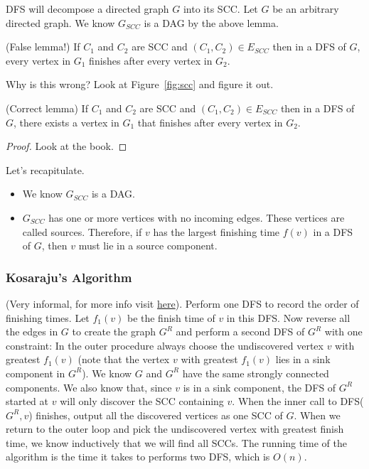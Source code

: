 DFS will decompose a directed graph $G$ into its SCC. Let $G$ be an
arbitrary directed graph. We know $G_{SCC}$ is a DAG by the above
lemma.

\begin{lemma}
    (False lemma!) If $C_1$ and $C_2$ are SCC and $(C_1, C_2) \in E_
    {SCC}$ then
    in a DFS of $G$, every vertex in $G_1$ finishes after every vertex
    in $G_2$.
\end{lemma}

Why is this wrong? Look at Figure~\ref{fig:scc} and figure it out.

\begin{lemma}
    (Correct lemma) If $C_1$ and $C_2$ are SCC and $(C_1, C_2) \in E_
    {SCC}$ then
    in a DFS of $G$, there exists a vertex in $G_1$ that finishes
    after every vertex
    in $G_2$.
\end{lemma}

\begin{proof}
    Look at the book.
\end{proof}

Let's recapitulate.

\begin{itemize}
    \item We know $G_{SCC}$ is a DAG.
    \item $G_{SCC}$ has one or more vertices with no incoming edges.
    These vertices are called sources. Therefore, if $v$ has the
    largest finishing time $f(v)$ in a DFS of $G$, then $v$ must lie
    in a source component.
\end{itemize}

\subsubsection{Kosaraju's Algorithm}

(Very informal, for more info visit 
\href{https://en.wikipedia.org/wiki/Kosaraju%27s_algorithm}{here}). Perform one DFS to record the
order of finishing times. Let $f_1(v)$ be the finish time of $v$ in this DFS.
Now reverse all the edges in $G$ to create the graph $G^R$ and perform a second DFS of $G^R$ with one constraint: In the outer procedure always choose the undiscovered vertex $v$ with greatest $f_1(v)$ (note that the vertex $v$ with greatest $f_1(v)$ lies in a sink component in $G^R$).
We know $G$ and $G^R$ have the same strongly connected components. We also
know that, since $v$ is in a sink component, the DFS of $G^R$ started at $v$
will only discover the SCC containing $v$. When the inner call to 
DFS($G^R, v$) finishes, output all the discovered vertices as one SCC of $G$.
When we return to the outer loop and pick the undiscovered vertex with
greatest finish time, we know inductively that we will find all SCCs.
The running time of the algorithm is the time it takes to performs two
DFS, which is $O(n)$.

